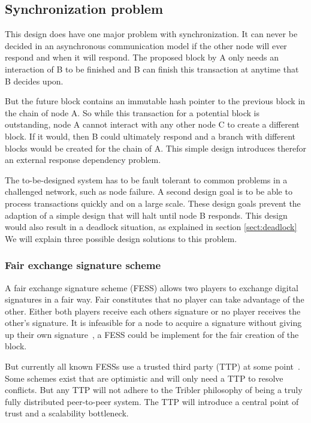 \subsection{Synchronization problem}
This design does have one major problem with synchronization.
It can never be decided in an asynchronous communication model
if the other node will ever respond and when it will respond.
The proposed block by A only needs an interaction of B to be finished
and B can finish this transaction at anytime that B decides upon.

But the future block contains an immutable hash pointer
to the previous block in the chain of node A.
So while this transaction for a potential block is outstanding,
node A cannot interact with any other node C to create a different block.
If it would, then B could ultimately respond and a branch with different blocks
would be created for the chain of A.
This simple design introduces therefor an external response dependency problem.

The to-be-designed system has to be fault tolerant to
common problems in a challenged network, such as node failure.
A second design goal is to be able to process transactions quickly and on a large scale.
These design goals prevent the adaption of a simple design that will halt until node B responds.
This design would also result in a deadlock situation, as explained in section \ref{sect:deadlock}
We will explain three possible design solutions to this problem.

\subsubsection{Fair exchange signature scheme}
A fair exchange signature scheme (FESS) allows two players to exchange digital signatures in a fair way.
Fair constitutes that no player can take advantage of the other.
Either both players receive each others signature or no player receives the other's signature.
It is infeasible for a node to acquire a signature without giving up their own signature~\cite{asokan-fairexchange},
a FESS could be implement for the fair creation of the block.

But currently all known FESSs use a trusted third party (TTP) at some point~\cite{asokan-fairexchange}.
Some schemes exist that are optimistic and will only need a TTP to resolve conflicts.
But any TTP will not adhere to the Tribler philosophy
of being a truly fully distributed peer-to-peer system.
The TTP will introduce a central point of trust and a scalability bottleneck.

